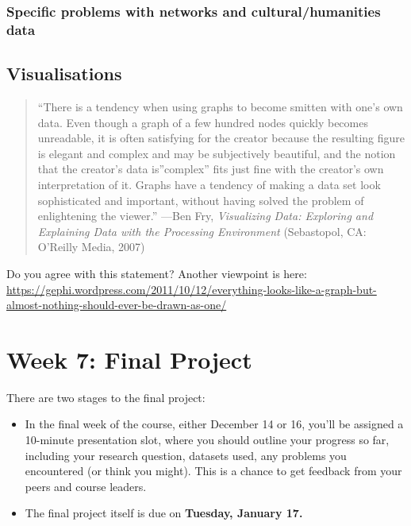 \documentclass[
]{book}
\begin{document}
\hypertarget{specific-problems-with-networks-and-culturalhumanities-data}{%
\subsection{Specific problems with networks and cultural/humanities data}\label{specific-problems-with-networks-and-culturalhumanities-data}}

\hypertarget{visualisations}{%
\section{Visualisations}\label{visualisations}}

\begin{quote}
``There is a tendency when using graphs to become smitten with one's own data. Even though a graph of a few hundred nodes quickly becomes unreadable, it is often satisfying for the creator because the resulting figure is elegant and complex and may be subjectively beautiful, and the notion that the creator's data is''complex'' fits just fine with the creator's own interpretation of it. Graphs have a tendency of making a data set look sophisticated and important, without having solved the problem of enlightening the viewer.'' ---Ben Fry, \emph{Visualizing Data: Exploring and Explaining Data with the Processing Environment} (Sebastopol, CA: O'Reilly Media, 2007)
\end{quote}

Do you agree with this statement? Another viewpoint is here: \url{https://gephi.wordpress.com/2011/10/12/everything-looks-like-a-graph-but-almost-nothing-should-ever-be-drawn-as-one/}

\hypertarget{week-7-final-project}{%
\chapter{Week 7: Final Project}\label{week-7-final-project}}

There are two stages to the final project:

\begin{itemize}
\item
  In the final week of the course, either December 14 or 16, you'll be assigned a 10-minute presentation slot, where you should outline your progress so far, including your research question, datasets used, any problems you encountered (or think you might). This is a chance to get feedback from your peers and course leaders.
\item
  The final project itself is due on \textbf{Tuesday, January 17.}
\end{itemize}
\end{document}
